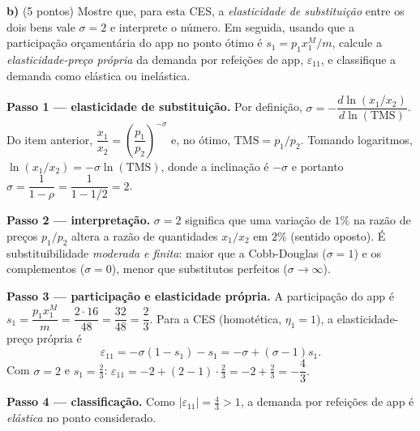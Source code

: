 \textbf{b)} (5 pontos) Mostre que, para esta CES, a \emph{elasticidade de substituição} entre os dois bens vale $\sigma=2$ e interprete o número. Em seguida, usando que a participação orçamentária do app no ponto ótimo é $s_1=p_1x_1^{M}/m$, calcule a \emph{elasticidade-preço própria} da demanda por refeições de app, $\varepsilon_{11}$, e classifique a demanda como elástica ou inelástica.
\resolucaobox{5.5cm}
\begin{solucao}
\textbf{Passo 1 --- elasticidade de substituição.} Por definição, $\sigma=-\dfrac{d\ln(x_1/x_2)}{d\ln(\text{TMS})}$. Do item anterior, $\dfrac{x_1}{x_2}=\left(\dfrac{p_1}{p_2}\right)^{-\sigma}$ e, no ótimo, $\text{TMS}=p_1/p_2$. Tomando logaritmos, $\ln(x_1/x_2)=-\sigma\ln(\text{TMS})$, donde a inclinação é $-\sigma$ e portanto $\sigma=\dfrac{1}{1-\rho}=\dfrac{1}{1-1/2}=2$.

\textbf{Passo 2 --- interpretação.} $\sigma=2$ significa que uma variação de $1\%$ na razão de preços $p_1/p_2$ altera a razão de quantidades $x_1/x_2$ em $2\%$ (sentido oposto). É substituibilidade \emph{moderada e finita}: maior que a Cobb-Douglas ($\sigma=1$) e os complementos ($\sigma=0$), menor que substitutos perfeitos ($\sigma\to\infty$).

\textbf{Passo 3 --- participação e elasticidade própria.} A participação do app é $s_1=\dfrac{p_1x_1^{M}}{m}=\dfrac{2\cdot16}{48}=\dfrac{32}{48}=\dfrac23$. Para a CES (homotética, $\eta_1=1$), a elasticidade-preço própria é
\[
\varepsilon_{11}=-\sigma(1-s_1)-s_1=-\sigma+(\sigma-1)s_1.
\]
Com $\sigma=2$ e $s_1=\tfrac23$: $\varepsilon_{11}=-2+(2-1)\cdot\tfrac23=-2+\tfrac23=-\dfrac{4}{3}.$

\textbf{Passo 4 --- classificação.} Como $|\varepsilon_{11}|=\tfrac43>1$, a demanda por refeições de app é \emph{elástica} no ponto considerado.


\end{solucao}
